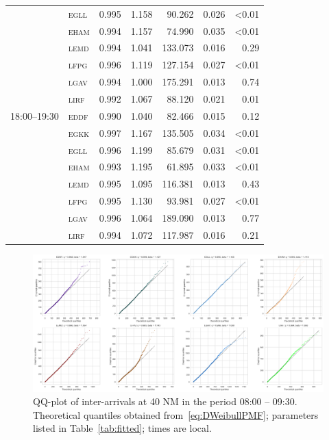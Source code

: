 \documentclass[draft,review]{elsarticle}
\newcommand{\airp}[1]{\textcolor{#1}{\textsc{#1}}}
\begin{document}
\begin{table}
\begin{tabular}{llrrrrr}
                   & \airp{egll} & 0.995 &   1.158 &  90.262 &     0.026 &     <0.01 \\
                   & \airp{eham} & 0.994 &   1.157 &  74.990 &     0.035 &     <0.01 \\
                   & \airp{lemd} & 0.994 &   1.041 & 133.073 &     0.016 &      0.29 \\
                   & \airp{lfpg} & 0.996 &   1.119 & 127.154 &     0.027 &     <0.01 \\
                   & \airp{lgav} & 0.994 &   1.000 & 175.291 &     0.013 &      0.74 \\
                   & \airp{lirf} & 0.992 &   1.067 &  88.120 &     0.021 &      0.01 \\
      18:00--19:30 & \airp{eddf} & 0.990 &   1.040 &  82.466 &     0.015 &      0.12 \\
                   & \airp{egkk} & 0.997 &   1.167 & 135.505 &     0.034 &     <0.01 \\
                   & \airp{egll} & 0.996 &   1.199 &  85.679 &     0.031 &     <0.01 \\
                   & \airp{eham} & 0.993 &   1.195 &  61.895 &     0.033 &     <0.01 \\
                   & \airp{lemd} & 0.995 &   1.095 & 116.381 &     0.013 &      0.43 \\
                   & \airp{lfpg} & 0.995 &   1.130 &  93.981 &     0.027 &     <0.01 \\
                   & \airp{lgav} & 0.996 &   1.064 & 189.090 &     0.013 &      0.77 \\
                   & \airp{lirf} & 0.994 &   1.072 & 117.987 &     0.016 &      0.21 \\
      \bottomrule
    \end{tabular}
\end{table}

\begin{figure}
    \includegraphics[width=\textwidth]{IA_qqplot0800-0930}
    \caption{QQ-plot of inter-arrivals at 40 NM in the period 08:00 -- 09:30. Theoretical quantiles obtained from~\eqref{eq:DWeibullPMF}; parameters listed in Table~\ref{tab:fitted}; times are local.}
    \label{fig:qqplot5-8}
\end{figure}
\end{document}
